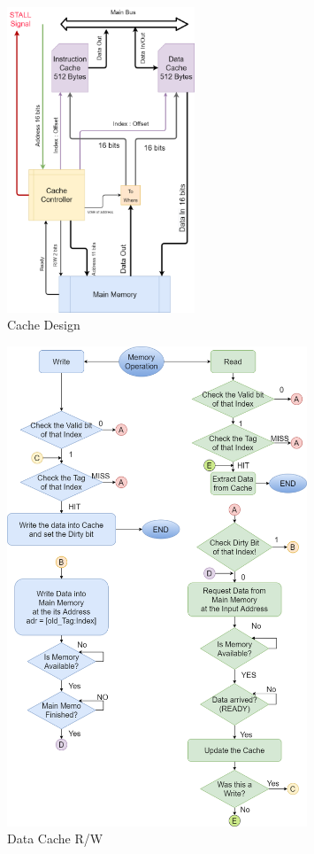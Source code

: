     \begin{figure}
        \centering
        \includegraphics[width=0.5\textwidth]{images/cache/full_cache_design.png}
        \caption{Cache Design}
        \label{fig:cacheDesign}
    \end{figure}


    \begin{figure}
        \centering
        \includegraphics[width=0.8\textwidth]{images/cache/cache_system_flowchart.png}
        \caption{Data Cache R/W}
        \label{fig:dataCache}
    \end{figure}

